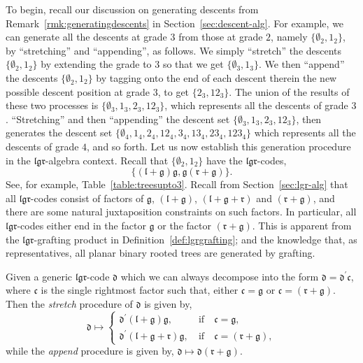 \documentclass[5p,twocolumn]{elsarticle}
\newcommand*{\el}{\mathfrak l}
\newcommand*{\gl}{\mathfrak g}
\newcommand*{\rl}{\mathfrak r}
\newcommand*{\df}{\mathfrak d}
\begin{document}
To begin, recall our discussion on generating descents from Remark~\ref{rmk:generatingdescents} in Section~\ref{sec:descent-alg}.
For example, we can generate all the descents at grade $3$ from those at grade $2$, namely $\{\emptyset_2,1_2\}$, by ``stretching'' and ``appending'', as follows.
We simply ``stretch'' the descents $\{\emptyset_2,1_2\}$ by extending the grade to $3$ so that we get $\{\emptyset_3,1_3\}$.
We then ``append'' the descents $\{\emptyset_2,1_2\}$ by tagging onto the end of each descent therein the new possible descent position at grade $3$, to get $\{2_3,12_3\}$.
The union of the results of these two processes is $\{\emptyset_3,1_3,2_3,12_3\}$, which represents all the descents of grade $3$. ``Stretching'' and then ``appending''
the descent set $\{\emptyset_3,1_3,2_3,12_3\}$, then generates the descent set $\{\emptyset_4,1_4,2_4,12_4,3_4,13_4,23_4,123_4\}$ which represents all the descents of grade $4$, and so forth.
Let us now establish this generation procedure in the $\el\gl\rl$-algebra context. Recall that $\{\emptyset_2,1_2\}$ have the $\el\gl\rl$-codes,
\begin{equation*}
\{(\el+\gl)\gl,\gl(\rl+\gl)\}.
\end{equation*}
See, for example, Table~\ref{table:treesupto3}.
Recall from Section~\ref{sec:lgr-alg} that all $\el\gl\rl$-codes consist of factors of $\gl$, $(\el+\gl)$, $(\el+\gl+\rl)$ and $(\rl+\gl)$,
and there are some natural juxtaposition constraints on such factors. In particular, all $\el\gl\rl$-codes either end in the factor $\gl$ or the factor $(\rl+\gl)$.
This is apparent from the $\el\gl\rl$-grafting product in Definition~\ref{def:lgrgrafting}; and the knowledge that, as representatives, all planar binary rooted trees are generated by grafting.
%
\begin{definition}\label{def:S&A}
  Given a generic $\el\gl\rl$-code $\df$ which we can always decompose into the form $\df=\df^\prime\mathfrak{c}$,
  where $\mathfrak{c}$ is the single rightmost factor such that, either $\mathfrak{c}=\gl$ or $\mathfrak{c}=(\rl+\gl)$.
  Then the \emph{stretch} procedure of $\df$ is given by,
  \begin{equation*}
    \df\mapsto\begin{cases}\df^\prime(\el+\gl)\gl, &~\text{if}\quad\mathfrak{c}=\gl,\\ \df^\prime(\el+\gl+\rl)\gl, &~\text{if}\quad\mathfrak{c}=(\rl+\gl),\end{cases}
  \end{equation*}
  while the \emph{append} procedure is given by, $\df\mapsto \df(\rl+\gl)$.
\end{definition}
\end{document}
